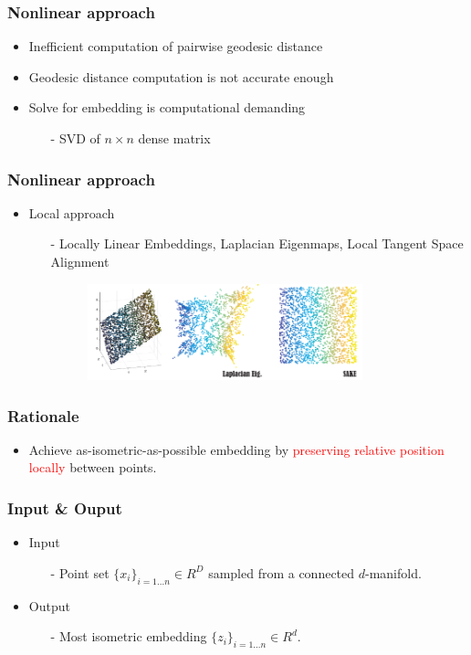 \documentclass[serif,mathserif, 12pt]{beamer}
\newcommand{\TODO}[1]{\textcolor{red}{#1}}
\begin{document}
\begin{frame}
  \frametitle{Nonlinear approach}
  \begin{itemize}
  \item Inefficient computation of pairwise geodesic distance
  \item Geodesic distance computation is not accurate enough
  \item Solve for embedding is computational demanding
    \begin{itemize}
    \item[-] SVD of $n\times n$ dense matrix
    \end{itemize}
  \end{itemize}
\end{frame}

\begin{frame}
  \frametitle{Nonlinear approach}
  \begin{itemize}
  \item Local approach
    \begin{itemize}
    \item[-] Locally Linear Embeddings, Laplacian Eigenmaps, Local Tangent Space Alignment
      \begin{figure}
        \centering
        \includegraphics[width=0.8\textwidth]{img/affine_precision}
      \end{figure}
    \end{itemize}
  \end{itemize}
\end{frame}

\begin{frame}
  \frametitle{Rationale}
  \begin{itemize}
  \item Achieve as-isometric-as-possible embedding by \TODO{preserving relative position locally}
    between points.
  \end{itemize}
\end{frame}

\begin{frame}
  \frametitle{Input \& Ouput}
  \begin{itemize}
  \item Input
    \begin{itemize}
    \item[-] Point set $\{x_i\}_{i=1...n} \in R^D$ sampled from a connected $d$-manifold.
    \end{itemize}
  \item Output
    \begin{itemize}
    \item[-] Most isometric embedding $\{z_i\}_{i=1\dots n} \in R^d$.
    \end{itemize}
  \end{itemize}
\end{frame}
\end{document}
